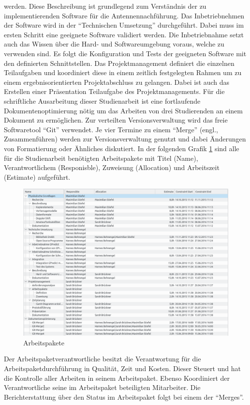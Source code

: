 werden. Diese Beschreibung ist grundlegend zum Verständnis der zu implementierenden Software 
für die Antennennachführung. Das Inbetriebnehmen der Software wird in der ``Technischen Umsetzung'' 
durchgeführt. Dabei muss im ersten Schritt eine geeignete Software validiert werden. Die 
Inbetriebnahme setzt auch das Wissen über die Hard- und Softwareumgebung voraus, welche zu 
verwenden sind. Es folgt die Konfiguration und Tests der geeigneten Software mit den definierten 
Schnittstellen.
\newpar
Das Projektmanagement definiert die einzelnen Teilaufgaben und koordiniert diese in einem zeitlich 
festgelegten Rahmen um zu einem ergebnisorientierten Projektabschluss zu gelangen. Dabei ist auch 
das Erstellen einer Präsentation Teilaufgabe des Projektmanagements.
\newpar
Für die schriftliche Ausarbeitung dieser Studienarbeit ist eine fortlaufende Dokumentenoptimierung 
nötig um das Arbeiten von drei Studierenden an einem Dokument zu ermöglichen. Zur verteilten 
Versionsverwaltung wird das freie Softwaretool ``Git'' verwendet. Je vier Termine zu einem 
``Merge'' (engl., Zusammenführen) werden zur Versionsverwaltung genutzt und dabei Änderungen von 
Formatierung oder Ähnliches diskutiert.
\newpar
In der folgenden Grafik \ref{fig:arbeitspaket} sind alle für die Studienarbeit benötigten 
Arbeitspakete mit Titel (Name), Verantwortlichem (Responisble), Zuweisung (Allocation) und 
Arbeitszeit (Estimate) aufgeführt.
\begin{figure}[h] 
 \centering
\includegraphics[width=1.0\linewidth]{./images/03task}
\caption{Arbeitspakete}
 \label{fig:arbeitspaket}
\end{figure}
\newpage

Der Arbeitspaketverantwortliche besitzt die Verantwortung für die Arbeitspaketdurchführung in 
Qualität, Zeit und Kosten. Dieser Steuert und hat die Kontrolle aller Arbeiten in seinem 
Arbeitspaket. Ebenso Koordiniert der Verantwortliche seine im Arbeitspaket beteiligten Mitarbeiter. 
Die Berichterstattung über den Status im Arbeitspaket folgt bei einem der ``Merges''.
\newpar

